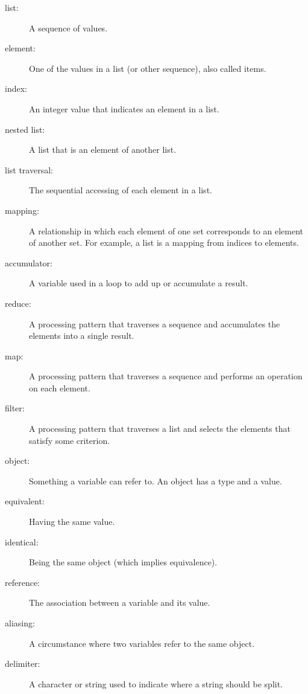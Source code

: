 \documentclass[10pt]{book}
\begin{document}
\begin{description}

\item[list:] A sequence of values.

\item[element:] One of the values in a list (or other sequence),
also called items.

\item[index:] An integer value that indicates an element in a list.

\item[nested list:] A list that is an element of another list.

\item[list traversal:] The sequential accessing of each element in a list.

\item[mapping:] A relationship in which each element of one set
corresponds to an element of another set.  For example, a list is
a mapping from indices to elements.

\item[accumulator:] A variable used in a loop to add up or
accumulate a result.


\item[reduce:] A processing pattern that traverses a sequence 
and accumulates the elements into a single result.

\item[map:] A processing pattern that traverses a sequence and
performs an operation on each element.

\item[filter:] A processing pattern that traverses a list and
selects the elements that satisfy some criterion.

\item[object:] Something a variable can refer to.  An object
has a type and a value.

\item[equivalent:] Having the same value.

\item[identical:] Being the same object (which implies equivalence).

\item[reference:] The association between a variable and its value.

\item[aliasing:] A circumstance where two variables refer to the same
object.

\item[delimiter:] A character or string used to indicate where a
string should be split.

\end{description}
\end{document}
